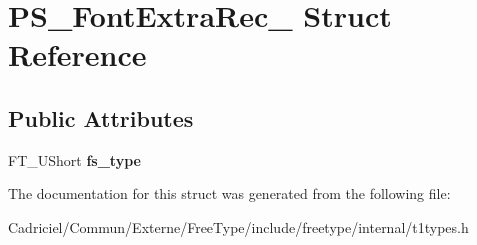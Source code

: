 \hypertarget{struct_p_s___font_extra_rec__}{\section{P\-S\-\_\-\-Font\-Extra\-Rec\-\_\- Struct Reference}
\label{struct_p_s___font_extra_rec__}
}
\subsection*{Public Attributes}
\begin{DoxyCompactItemize}
\item 
\hypertarget{struct_p_s___font_extra_rec___a048e1e57ee974c3e05e9a88476e6b8a9}{F\-T\-\_\-\-U\-Short {\bfseries fs\-\_\-type}}\label{struct_p_s___font_extra_rec___a048e1e57ee974c3e05e9a88476e6b8a9}

\end{DoxyCompactItemize}


The documentation for this struct was generated from the following file\-:\begin{DoxyCompactItemize}
\item 
Cadriciel/\-Commun/\-Externe/\-Free\-Type/include/freetype/internal/t1types.\-h\end{DoxyCompactItemize}
